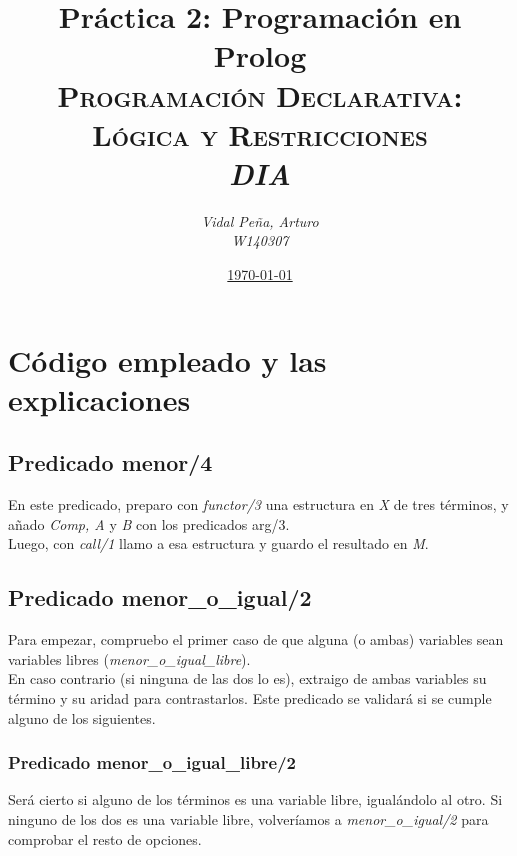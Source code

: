 \documentclass[12pt, a4paper, spanish]{article}
\title{\textbf{Práctica 2: Programación en Prolog} \\
	\textsc{Programación Declarativa: Lógica y Restricciones} \\
	\emph{DIA}}
\author{\emph{Vidal Peña, Arturo}\\
		\emph{W140307}}
\date{\underline{\today}}
\begin{document}
	
\maketitle
\thispagestyle{empty}
\renewcommand*\contentsname{Índice de contenidos}
\tableofcontents
\pagebreak


\section{Código empleado y las explicaciones}

\subsection{Predicado menor/4}


En este predicado, preparo con \emph{functor/3} una estructura en \emph{X} de tres términos, y añado \emph{Comp, A} y \emph{B} con los predicados arg/3.\\

Luego, con \emph{call/1} llamo a esa estructura y guardo el resultado en \emph{M}.

\subsection{Predicado menor\_o\_igual/2}
 

Para empezar, compruebo el primer caso de que alguna (o ambas) variables sean variables libres (\textit{menor\_o\_igual\_libre}).\\

En caso contrario (si ninguna de las dos lo es), extraigo de ambas variables su término y su aridad para contrastarlos. Este predicado se validará si se cumple alguno de los siguientes.

\subsubsection{Predicado menor\_o\_igual\_libre/2}


Será cierto si alguno de los términos es una variable libre, igualándolo al otro. Si ninguno de los dos es una variable libre, volveríamos a \textit{menor\_o\_igual/2} para comprobar el resto de opciones.
\end{document}
